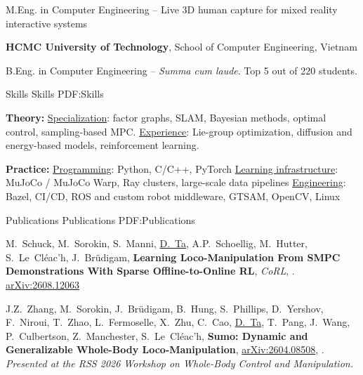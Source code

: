 \documentclass[letterpaper,MMMyyyy,nonstopmode]{simpleresumecv}
\begin{document}
\begin{Body}
\Gap
\BulletItem
M.Eng. in Computer Engineering
\hfill
{} -- 
\SubBulletItem
Live 3D human capture for mixed reality interactive systems

\BigGap
\Entry
{\textbf{HCMC University of Technology}}, School of Computer Engineering, Vietnam

\Gap
\BulletItem
B.Eng. in Computer Engineering
\hfill
{} -- 
\SubBulletItem
\textit{Summa cum laude}. Top 5 out of 220 students.




\Section
{Skills}
{Skills}
{PDF:Skills}

\Entry
{\textbf{Theory:}}
\Gap
\BulletItem
\underline{Specialization}: factor graphs, SLAM, Bayesian methods, optimal control, sampling-based MPC.
\BulletItem
\underline{Experience}: Lie-group optimization, diffusion and energy-based models, reinforcement learning.

\BigGap
\Entry
{\textbf{Practice:}}
\Gap
\BulletItem
\underline{Programming}: Python, C/C++, PyTorch
\BulletItem
\underline{Learning infrastructure}: MuJoCo / MuJoCo Warp, Ray clusters, large-scale data pipelines
\BulletItem
\underline{Engineering}: Bazel, CI/CD, ROS and custom robot middleware, GTSAM, OpenCV, Linux


\Section
{Publications}
{Publications}
{PDF:Publications}

\begingroup
\renewcommand{\MaxNumberedItem}{[8888]}

\Gap
\NumberedItem{[24]}
{M.~Schuck, M.~Sorokin, S.~Manni, \underline{D.~Ta}, A.P.~Schoellig, M.~Hutter, S.~Le~Cléac'h, J.~Brüdigam,
\textbf{Learning Loco-Manipulation From SMPC Demonstrations With Sparse Offline-to-Online RL},
\textit{CoRL},
. \href{https://arxiv.org/abs/2608.12063}{arXiv:2608.12063}}

\Gap
\NumberedItem{[23]}
{J.Z.~Zhang, M.~Sorokin, J.~Brüdigam, B.~Hung, S.~Phillips, D.~Yershov, F.~Niroui, T.~Zhao, L.~Fermoselle, X.~Zhu, C.~Cao, \underline{D.~Ta}, T.~Pang, J.~Wang, P.~Culbertson, Z.~Manchester, S.~Le~Cléac'h,
\textbf{Sumo: Dynamic and Generalizable Whole-Body Loco-Manipulation},
\href{https://arxiv.org/abs/2604.08508}{arXiv:2604.08508},
. \textit{Presented at the RSS 2026 Workshop on Whole-Body Control and Manipulation.}}


\end{Body}
\end{document}
